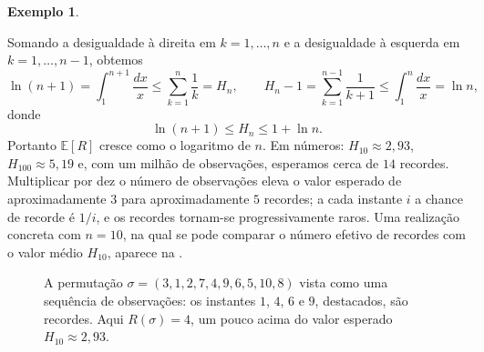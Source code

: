 \documentclass[12pt,portuguese]{article}
\theoremstyle{definition}
\newtheorem{example}[example]{Exemplo}
\begin{document}
\begin{example}
\begin{center}
\end{center}
Somando a desigualdade à direita em $k=1,\ldots,n$ e a desigualdade à
esquerda em $k=1,\ldots,n-1$, obtemos
\[
\ln(n+1)
=\int_1^{n+1}\frac{dx}{x}
\leqslant\sum_{k=1}^{n}\frac{1}{k}
=H_n,
\qquad
H_n-1
=\sum_{k=1}^{n-1}\frac{1}{k+1}
\leqslant\int_1^{n}\frac{dx}{x}
=\ln n,
\]
donde
\[
\ln(n+1)\leqslant H_n\leqslant 1+\ln n.
\]
Portanto $\mathbb{E}[R]$ cresce como o logaritmo de $n$. Em números:
$H_{10}\approx 2{,}93$, $H_{100}\approx 5{,}19$ e, com um milhão de
observações, esperamos cerca de $14$ recordes. Multiplicar por dez o número
de observações eleva o valor esperado de aproximadamente $3$ para
aproximadamente $5$ recordes; a cada instante $i$ a chance de recorde é
$1/i$, e os recordes tornam-se progressivamente raros. Uma realização
concreta com $n=10$, na qual se pode comparar o número efetivo de recordes com
o valor médio $H_{10}$, aparece na .
\end{example}

\begin{figure}[H]
\centering
{}
\caption{A permutação $\sigma=(3,1,2,7,4,9,6,5,10,8)$ vista como uma
sequência de observações: os instantes $1$, $4$, $6$ e $9$, destacados, são
recordes. Aqui $R(\sigma)=4$, um pouco acima do valor esperado
$H_{10}\approx 2{,}93$.}
\label{fig:recordes-agulhas}
\end{figure}
\end{document}
